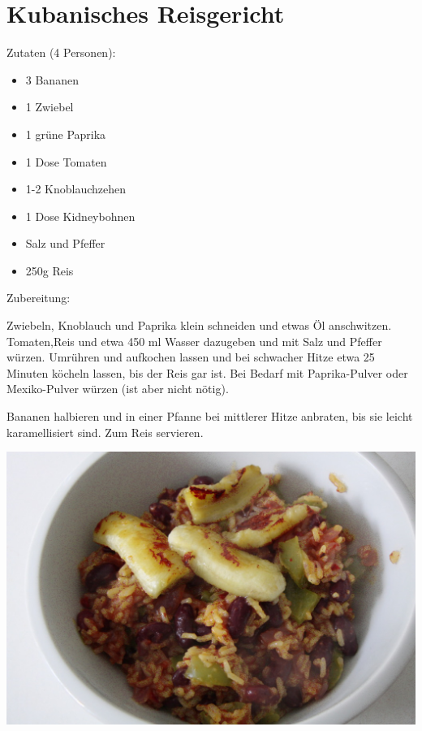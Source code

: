 \section{Kubanisches Reisgericht}
Zutaten (4 Personen):
\begin{itemize}
    \item 3 Bananen
    \item 1 Zwiebel
    \item 1 grüne Paprika
    \item 1 Dose Tomaten
    \item 1-2 Knoblauchzehen
    \item 1 Dose Kidneybohnen
    \item Salz und Pfeffer
    \item 250g Reis
\end{itemize}

\noindent Zubereitung:

\noindent Zwiebeln, Knoblauch und Paprika klein schneiden und etwas Öl
anschwitzen. Tomaten,Reis und etwa 450 ml Wasser dazugeben und mit Salz und
Pfeffer würzen. Umrühren und aufkochen lassen und bei schwacher Hitze etwa 25
Minuten köcheln lassen, bis der Reis gar ist. Bei Bedarf mit Paprika-Pulver
oder Mexiko-Pulver würzen (ist aber nicht nötig).

\noindent Bananen halbieren und in einer Pfanne bei mittlerer Hitze anbraten,
bis sie leicht karamellisiert sind. Zum Reis servieren.

\newpage
\mbox{}
\vfill
\begin{center}
    \includegraphics[width=\textwidth]{Kubanisches-Reisgericht/IMG_3600._small.jpg}
\end{center}
\vfill
\mbox{ }
\newpage
